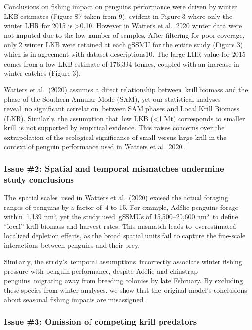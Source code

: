 \documentclass[]{elsarticle} %
\begin{document}
Conclusions on fishing impact on penguins performance were driven by
winter LKB estimates (Figure S7 taken from 9), evident in Figure 3 where
only the winter LHR for 2015 is \textgreater0.10. However in Watters et
al.~2020 winter data were not imputed due to the low number of samples.
After filtering for poor coverage, only 2 winter LKB were retained at
each gSSMU for the entire study (Figure 3) which is in agreement with
dataset descriptions10. The large LHR value for 2015 comes from a low
LKB estimate of 176,394 tonnes, coupled with an increase in winter
catches (Figure 3).

Watters et al.~(2020) assumes a direct relationship between~krill
biomass and the phase of the Southern Annular Mode (SAM), yet our
statistical analyses reveal~no significant correlation~between SAM
phases and Local Krill Biomass (LKB). Similarly, the assumption that~low
LKB (\textless1 Mt) corresponds to smaller krill~is not supported by
empirical evidence. This raises concerns over the extrapolation of the
ecological significance of small versus large krill in the context of
penguin performance used in Watters et al.~2020.

\subsubsection{Issue \#2: Spatial and temporal mismatches undermine
study
conclusions}\label{issue-2-spatial-and-temporal-mismatches-undermine-study-conclusions}

The~spatial scales~used in Watters et al.~(2020) exceed the actual
foraging ranges of penguins by a factor of~4 to 15. For example, Adélie
penguins forage within~1,139 nm², yet the study used~gSSMUs of
15,500--20,600 nm²~to define ``local'' krill biomass and harvest rates.
This mismatch leads to~overestimated localized depletion effects, as the
broad spatial units fail to capture the fine-scale interactions between
penguins and their prey.

Similarly, the study's~temporal assumptions~incorrectly associate winter
fishing pressure with penguin performance, despite Adélie and chinstrap
penguins~migrating away from breeding colonies by late February. By
excluding these species from winter analyses, we show that the~original
model's conclusions about seasonal fishing impacts are misassigned.

\subsubsection{Issue \#3: Omission of competing krill
predators}\label{issue-3-omission-of-competing-krill-predators}
\end{document}
